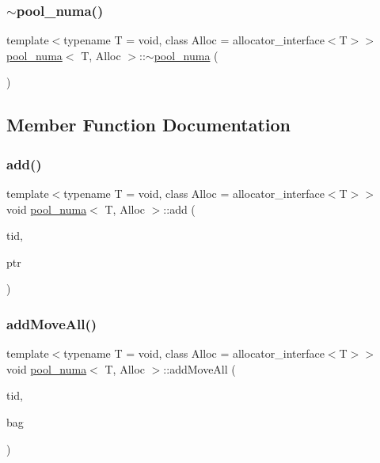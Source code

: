 \subsubsection{\texorpdfstring{$\sim$pool\+\_\+numa()}{~pool\_numa()}}
{\footnotesize\ttfamily template$<$typename T  = void, class Alloc  = allocator\+\_\+interface$<$\+T$>$$>$ \\
\hyperlink{classpool__numa}{pool\+\_\+numa}$<$ T, Alloc $>$\+::$\sim$\hyperlink{classpool__numa}{pool\+\_\+numa} (\begin{DoxyParamCaption}{ }\end{DoxyParamCaption})\hspace{0.3cm}{\ttfamily [inline]}}



\subsection{Member Function Documentation}
\mbox{\label{classpool__numa_a0ffdd17b3201916fe7a7eabef807c1e0}} 
\subsubsection{\texorpdfstring{add()}{add()}}
{\footnotesize\ttfamily template$<$typename T  = void, class Alloc  = allocator\+\_\+interface$<$\+T$>$$>$ \\
void \hyperlink{classpool__numa}{pool\+\_\+numa}$<$ T, Alloc $>$\+::add (\begin{DoxyParamCaption}\item[{const int}]{tid,  }\item[{T $\ast$}]{ptr }\end{DoxyParamCaption})\hspace{0.3cm}{\ttfamily [inline]}}

\mbox{\label{classpool__numa_afa864cb84a8d1e5b5bae1745d0ef36bc}} 
\subsubsection{\texorpdfstring{add\+Move\+All()}{addMoveAll()}}
{\footnotesize\ttfamily template$<$typename T  = void, class Alloc  = allocator\+\_\+interface$<$\+T$>$$>$ \\
void \hyperlink{classpool__numa}{pool\+\_\+numa}$<$ T, Alloc $>$\+::add\+Move\+All (\begin{DoxyParamCaption}\item[{const int}]{tid,  }\item[{\hyperlink{classblockbag}{blockbag}$<$ T $>$ $\ast$}]{bag }\end{DoxyParamCaption})\hspace{0.3cm}{\ttfamily [inline]}}

